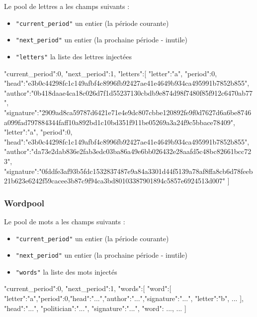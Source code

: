 \documentclass{article}
\begin{document}
 Le pool de lettres a les champs suivants :
 \begin{itemize}
 \item \texttt{"current\_period"} un entier (la période courante)
 \item  \texttt{"next\_period"} un entier (la prochaine période -
   inutile)
 \item  \texttt{"letters"} la liste des lettres injectées
 \end{itemize}
\begin{jsonMessage}
   { "current_period":0, "next_period":1, "letters":[
     { "letter":"a", "period":0,
       "head":"e3b0c44298fc1c149afbf4c8996fb92427ae41e4649b934ca495991b7852b855",
       "author":"0b418daae4ca18c026d7f1d55237130cbdb9e874d98f7480f85f912c6470ab77",
       "signature":"2909ad8ca59787d6421e71e4e9dc807cbbe120892fe9f0d7627d6a6be8746a099fad797884344faff10a892bd1c10bd351f911be05269a3a24f9c5bbace78409"},
     { "letter":"a", "period":0,
       "head":"e3b0c44298fc1c149afbf4c8996fb92427ae41e4649b934ca495991b7852b855",
       "author":"da73e2dab836e2fab3edc03ba86a49e6bb026432e28aafd5c48bc82661bcc723",
       "signature":"0fddfe3af93b5fdc1532837487e9a84a3301d44f5139a78af8ffa8cb6d78feeb21b623e6242f59cacee3b87c9f94ca3bd80103387901894c5857e6924513d007"}
     ]  }
\end{jsonMessage}
 \subsubsection{Wordpool}
 \label{sec:wordpool}
 Le pool de mots a les champs suivants :
 \begin{itemize}
 \item \texttt{"current\_period"} un entier (la période courante)
 \item  \texttt{"next\_period"} un entier (la prochaine période - inutile)
 \item  \texttt{"words"} la liste des mots injectés
 \end{itemize}

\begin{jsonMessage}
   {"current_period":0, "next_period":1, "words":[
     { "word":[
       {"letter":"a","period":0,"head":"...","author":"...","signature":"..."},
       {"letter":"b", ...}  ], "head":"...", "politician":"...",
       "signature":"..."},
     { "word": ..., ...}  ] }
\end{jsonMessage}
\end{document}

